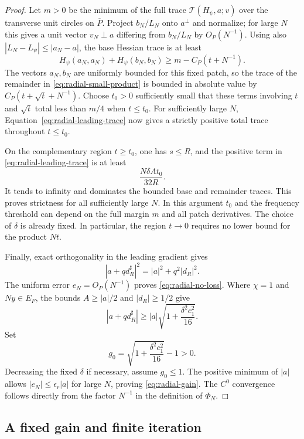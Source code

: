 \begin{proof}
Let $m>0$ be the minimum of the full trace
$\mathcal T(H_\psi,a;v)$ over the transverse unit circles on
$\overline P$.  Project $b_N/L_N$ onto $a^\perp$ and normalize; for
large $N$ this gives a unit vector $v_N\perp a$ differing from
$b_N/L_N$ by $O_P(N^{-1})$.  Using also
$|L_N-L_\psi|\le|a_N-a|$, the base Hessian trace is at least
\[
 H_\psi(a_N,a_N)+H_\psi(b_N,b_N)
 \ge m-C_P(t+N^{-1}).
\]
The vectors $a_N,b_N$ are uniformly bounded for this fixed patch, so the
trace of the remainder in \eqref{eq:radial-small-product} is
bounded in absolute value by $C_P(t+\sqrt t+N^{-1})$.
Choose $t_0>0$ sufficiently small that these terms involving $t$ and
$\sqrt t$ total less than $m/4$ when $t\le t_0$.  For sufficiently large
$N$, Equation~\eqref{eq:radial-leading-trace} now gives a strictly
positive total trace throughout $t\le t_0$.

On the complementary region $t\ge t_0$, one has $s\le R$, and the
positive term in \eqref{eq:radial-leading-trace} is at least
\[
 \frac{N\delta A t_0}{32R}.
\]
It tends to infinity and dominates the bounded base and remainder traces.
This proves strictness for all sufficiently large $N$.  In this argument
$t_0$ and the frequency threshold can depend on the full margin $m$ and
all patch derivatives.  The choice of $\delta$ is already fixed.  In
particular, the region $t\to0$ requires no lower bound for the product
$Nt$.

Finally, exact orthogonality in the leading gradient gives
\[
 |a+q d_R^\sharp|^2=|a|^2+q^2|d_R|^2.
\]
The uniform error $e_N=O_P(N^{-1})$ proves
\eqref{eq:radial-no-loss}.  Where $\chi=1$ and $Ny\in E_F$,
the bounds $A\ge|a|/2$ and $|d_R|\ge1/2$ give
\[
 |a+q d_R^\sharp|
 \ge |a|\sqrt{1+\frac{\delta^2c_1^2}{16}}.
\]
Set
\[
 g_0=\sqrt{1+\frac{\delta^2c_1^2}{16}}-1>0.
\]
Decreasing the fixed $\delta$ if necessary, assume $g_0\le1$.  The
positive minimum of $|a|$ allows $|e_N|\le\epsilon_r|a|$ for large
$N$, proving \eqref{eq:radial-gain}.  The $C^0$ convergence
follows directly from the factor $N^{-1}$ in the definition of $\Phi_N$.
\end{proof}

\subsection{A fixed gain and finite iteration}

